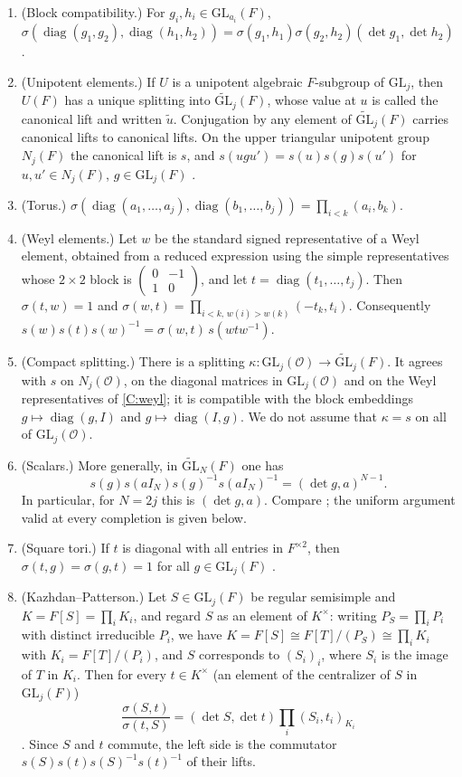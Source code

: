 \documentclass[11pt,oneside,notitlepage]{book}
\numberwithin{equation}{section}
\theoremstyle{plain}
\theoremstyle{definition}
\newcommand{\cO}{\mathcal{O}}
\newcommand{\GL}{\mathrm{GL}}
\newcommand{\tGL}{\widetilde{\GL}}
\newcommand{\diag}{\operatorname{diag}}
\newcommand{\hil}[2]{(#1,#2)}
\begin{document}
\begin{enumerate}[label=(C\arabic*)]
	\item\label{C:block} (Block compatibility.) For $g_i,h_i\in\GL_{a_i}(F)$,
	$\sigma(\diag(g_1,g_2),\diag(h_1,h_2))=\sigma(g_1,h_1)\sigma(g_2,h_2)\hil{\det g_1}{\det h_2}$ \cite[\S1.2, (1.1)]{KM}.
	\item\label{C:unip} (Unipotent elements.) If $U$ is a unipotent algebraic $F$-subgroup of $\GL_j$, then $U(F)$ has a unique splitting into $\tGL_j(F)$, whose value at $u$ is called the canonical lift and written $\tilde u$. Conjugation by any element of $\tGL_j(F)$ carries canonical lifts to canonical lifts. On the upper triangular unipotent group $N_j(F)$ the canonical lift is $s$, and $s(ugu')=s(u)s(g)s(u')$ for $u,u'\in N_j(F)$, $g\in\GL_j(F)$ \cite[\S1.2]{KM}.
	\item\label{C:torus} (Torus.) $\sigma(\diag(a_1,\dots,a_j),\diag(b_1,\dots,b_j))=\prod_{i<k}\hil{a_i}{b_k}$.
	\item\label{C:weyl} (Weyl elements.) Let $w$ be the standard signed representative of a Weyl element, obtained from a reduced expression using the simple representatives whose $2\times2$ block is $\left(\begin{smallmatrix}0&-1\\1&0\end{smallmatrix}\right)$, and let $t=\diag(t_1,\dots,t_j)$. Then $\sigma(t,w)=1$ and $\sigma(w,t)=\prod_{i<k,\,w(i)>w(k)}\hil{-t_k}{t_i}$. Consequently $s(w)s(t)s(w)^{-1}=\sigma(w,t)\, s(wtw^{-1})$.
	\item\label{C:compact} (Compact splitting.) There is a splitting $\kappa:\GL_j(\cO)\to\tGL_j(F)$. It agrees with $s$ on $N_j(\cO)$, on the diagonal matrices in $\GL_j(\cO)$ and on the Weyl representatives of \ref{C:weyl}; it is compatible with the block embeddings $g\mapsto\diag(g,I)$ and $g\mapsto\diag(I,g)$. We do not assume that $\kappa=s$ on all of $\GL_j(\cO)$.
	\item\label{C:center} (Scalars.) More generally, in $\tGL_N(F)$ one has
	\[
	s(g)s(aI_N)s(g)^{-1}s(aI_N)^{-1}=\hil{\det g}{a}^{N-1}.
	\]
	In particular, for $N=2j$ this is $\hil{\det g}{a}$. Compare \cite[(2.6)]{Kable}; the uniform argument valid at every completion is given below.
	\item\label{C:squares} (Square tori.) If $t$ is diagonal with all entries in $F^{\times2}$, then $\sigma(t,g)=\sigma(g,t)=1$ for all $g\in\GL_j(F)$ \cite[Claim 3.7, Remark 3.8]{KM}.
	\item\label{C:KP} (Kazhdan--Patterson.) Let $S\in\GL_j(F)$ be regular semisimple and $K=F[S]=\prod_iK_i$, and regard $S$ as an element of $K^\times$: writing $P_S=\prod_iP_i$ with distinct irreducible $P_i$, we have $K=F[S]\cong F[T]/(P_S)\cong\prod_iK_i$ with $K_i=F[T]/(P_i)$, and $S$ corresponds to $(S_i)_i$, where $S_i$ is the image of $T$ in $K_i$. Then for every $t\in K^\times$ (an element of the centralizer of $S$ in $\GL_j(F)$)
	\[
	\frac{\sigma(S,t)}{\sigma(t,S)}=\hil{\det S}{\det t}\prod_i\hil{S_i}{t_i}_{K_i}
	\]
	\cite[Proposition 0.1.5]{KP}. Since $S$ and $t$ commute, the left side is the commutator $s(S)s(t)s(S)^{-1}s(t)^{-1}$ of their lifts.
\end{enumerate}
\end{document}
